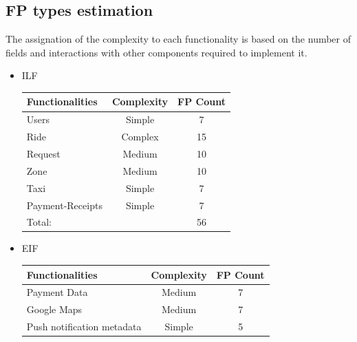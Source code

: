 \documentclass[a4paper,11pt]{report} %
\begin{document}
		\subsection{FP types estimation}
			The assignation of the complexity to each functionality is based on the number of fields and interactions with other components required to implement it. 
			\begin{itemize}
				\item ILF
							\renewcommand{\arraystretch}{1.2}
							\setlength{\tabcolsep}{12pt}
					\begin{center}
						\begin{tabular}{| p{7cm} | p{2.5cm} | p{2cm} |}\hline
							\textbf{Functionalities} & \multicolumn{1}{|c|}{\textbf{Complexity}} & \textbf{FP Count}\\\hline
							Users & \multicolumn{1}{|c|}{Simple} & \multicolumn{1}{|c|}{7}\\\hline
							Ride & \multicolumn{1}{|c|}{Complex} & \multicolumn{1}{|c|}{15}\\\hline
							Request & \multicolumn{1}{|c|}{Medium} & \multicolumn{1}{|c|}{10}\\\hline		
							Zone & \multicolumn{1}{|c|}{Medium} & \multicolumn{1}{|c|}{10}\\\hline	
							Taxi & \multicolumn{1}{|c|}{Simple} & \multicolumn{1}{|c|}{7}\\\hline		
							Payment-Receipts & \multicolumn{1}{|c|}{Simple} & \multicolumn{1}{|c|}{7}\\\hline																														
							\multicolumn{2}{|l|}{Total:} & \multicolumn{1}{|c|}{56}\\\hline
						\end{tabular}
					\end{center}
				\item EIF
				\renewcommand{\arraystretch}{1.2}
				\setlength{\tabcolsep}{12pt}
				\begin{center}
					\begin{tabular}{| p{7cm} | p{2.5cm} | p{2cm} |}\hline
						\textbf{Functionalities} & \multicolumn{1}{|c|}{\textbf{Complexity}} & \textbf{FP Count}\\\hline						
						Payment Data & \multicolumn{1}{|c|}{Medium} & \multicolumn{1}{|c|}{7}\\\hline
						Google Maps & \multicolumn{1}{|c|}{Medium} & \multicolumn{1}{|c|}{7}\\\hline
						Push notification metadata & \multicolumn{1}{|c|}{Simple} & \multicolumn{1}{|c|}{5}\\\hline		

\end{tabular}
\end{center}
\end{itemize}
\end{document}
